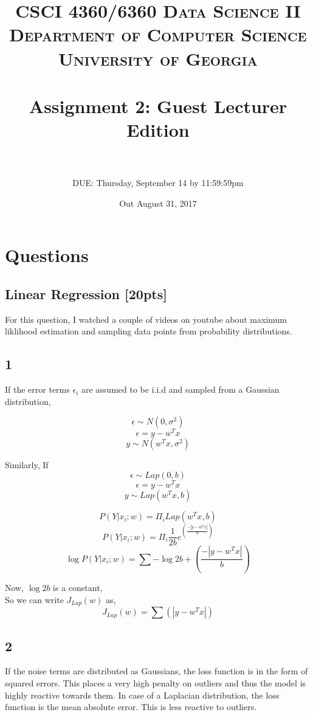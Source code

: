 \documentclass[paper=a4, fontsize=11pt]{scrartcl} %
\title{	
\normalfont \normalsize 
\textsc{CSCI 4360/6360 Data Science II} \\
\textsc{Department of Computer Science} \\
\textsc{University of Georgia} \\ [15pt] %
\horrule{0.5pt} \\[0.3cm] %
\huge Assignment 2: Guest Lecturer Edition \\ %
\horrule{2pt} \\[0.4cm] %
}
\author{DUE: Thursday, September 14 by 11:59:59pm} %
\date{\normalsize Out August 31, 2017}
\numberwithin{figure}{section} %
\numberwithin{table}{section} %
\begin{document}
\maketitle %



\section*{Questions}
\setcounter{subsection}{0}

\subsection{Linear Regression \textbf{[20pts]}}
For this question, I watched a couple of videos on youtube about maximum liklihood estimation and sampling data points from probability distributions. \\

\subsection*{1}
If the error terms $\epsilon_{i}$ are assumed to be i.i.d and sampled from a Gaussian distribution,

$$\epsilon \sim N(0,\sigma^{2})$$
$$\epsilon=y-w^{T}x$$
$$ y \sim N(w^{T}x,\sigma^{2})$$

Similarly, If\\

$$\epsilon \sim Lap(0,b)$$
$$\epsilon=y-w^{T}x$$
$$ y \sim Lap(w^{T}x,b)$$

$$P(Y|x_{i};w)=\Pi_{i} Lap(w^{T}x,b)$$
$$P(Y|x_{i};w)=\Pi_{i} \frac{1}{2b} e^{(\frac{-|y-w^{T}x|}{b})}$$
$$\log P(Y|x_{i};w)=\sum -\log 2b+\left( \frac{-|y-w^{T}x|}{b}\right)$$

Now, $\log 2b$ is a constant, \\
So we can write $J_{Lap}(w)$ as,\\

$$J_{Lap}(w)=\sum \left( |y-w^{T}x|\right)$$

\subsection*{2}

If the noise terms are distributed as Gaussians, the loss function is in the form of squared errors. This places a very high penalty on outliers and thus the model is highly reactive towards them. In case of a Laplacian distribution, the loss function is the mean absolute error. This is less reactive to outliers. 
\end{document}
